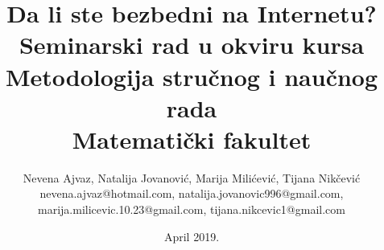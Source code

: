 \documentclass[a4paper]{article}
\theoremstyle{break}
\begin{document}
\title{Da li ste bezbedni na Internetu?\\ \small{Seminarski rad u okviru kursa\\Metodologija stručnog i naučnog rada\\ Matematički fakultet}}

\author{Nevena Ajvaz, Natalija Jovanović, Marija Milićević, Tijana Nikčević\\ nevena.ajvaz@hotmail.com, natalija.jovanovic996@gmail.com,\\
marija.milicevic.10.23@gmail.com, tijana.nikcevic1@gmail.com}

\date{April 2019.}

\maketitle
\end{document}
